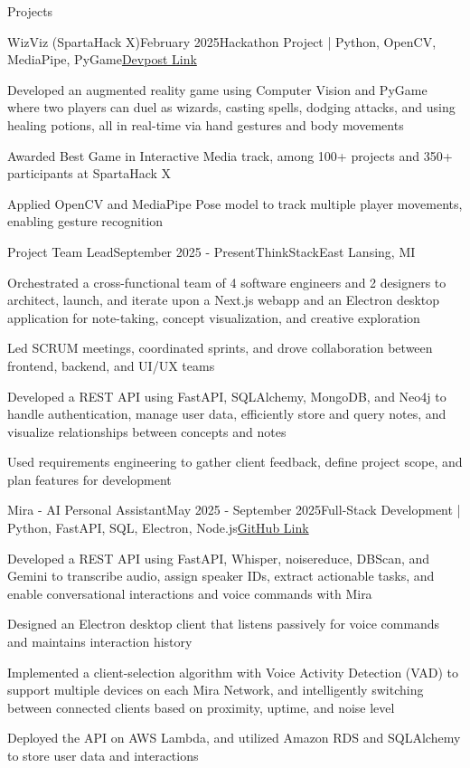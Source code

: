 \documentclass[
	11pt
]{resume}
\begin{document}
	\begin{rSection}{P}{rojects}
		\begin{rSectionEntry}{WizViz (SpartaHack X)}{February 2025}{Hackathon Project | Python, OpenCV, MediaPipe, PyGame}{\href{https://devpost.com/software/wizviz}{Devpost Link}}
			\item Developed an augmented reality game using Computer Vision and PyGame where two players can duel as wizards, casting spells, dodging attacks, and using healing potions, all in real-time via hand gestures and body movements
			\item Awarded Best Game in Interactive Media track, among 100+ projects and 350+ participants at SpartaHack X
			\item Applied OpenCV and MediaPipe Pose model to track multiple player movements, enabling gesture recognition
		\end{rSectionEntry}

		\begin{rSectionEntry}{Project Team Lead}{September 2025 - Present}{ThinkStack}{East Lansing, MI}
			\item Orchestrated a cross-functional team of 4 software engineers and 2 designers to architect, launch, and iterate upon a Next.js webapp and an Electron desktop application for note-taking, concept visualization, and creative exploration
			\item Led SCRUM meetings, coordinated sprints, and drove collaboration between frontend, backend, and UI/UX teams
			\item Developed a REST API using FastAPI, SQLAlchemy, MongoDB, and Neo4j to handle authentication, manage user data, efficiently store and query notes, and visualize relationships between concepts and notes
			\item Used requirements engineering to gather client feedback, define project scope, and plan features for development
		\end{rSectionEntry}

		\begin{rSectionEntry}{Mira - AI Personal Assistant}{May 2025 - September 2025}{Full-Stack Development | Python, FastAPI, SQL, Electron, Node.js}{\href{https://github.com/mira-assistant}{GitHub Link}}
			\item Developed a REST API using FastAPI, Whisper, noisereduce, DBScan, and Gemini to transcribe audio, assign speaker IDs, extract actionable tasks, and enable conversational interactions and voice commands with Mira
			\item Designed an Electron desktop client that listens passively for voice commands and maintains interaction history
			\item Implemented a client-selection algorithm with Voice Activity Detection (VAD) to support multiple devices on each Mira Network, and intelligently switching between connected clients based on proximity, uptime, and noise level
			\item Deployed the API on AWS Lambda, and utilized Amazon RDS and SQLAlchemy to store user data and interactions
		\end{rSectionEntry}
	\end{rSection}
\end{document}
